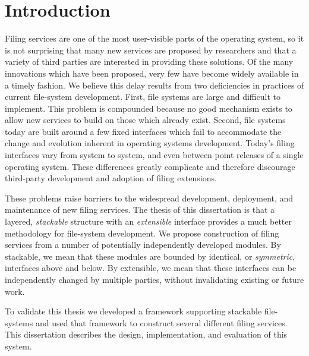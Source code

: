 
%
%

\chapter{Introduction}

Filing services are one of the most user-visible
  parts of the operating system,
  so it is not surprising that 
  many new services are proposed
  by researchers
  and that a variety of third parties are interested in providing
  these solutions.
Of the many innovations which have been proposed,
  very few have become widely available
  in a timely fashion.
We believe this delay results from two deficiencies
  in practices of current file-system development.
First,
  file systems are large and difficult to implement.
This problem is compounded because
  no good mechanism exists to allow
  new services to build on those which already exist.
Second,
  file systems today are built around a few fixed interfaces
  which fail to accommodate the change and evolution inherent in
  operating systems development.
Today's filing interfaces vary from
  system to system,
  and even between point releases of a 
  single operating system.
These differences greatly complicate and therefore discourage
  third-party development and adoption of filing extensions.

These problems raise barriers to the widespread
  development, deployment, and maintenance of new filing
  services.
The thesis of this dissertation is that
  a layered,
  \emph{stackable} structure
  with an \emph{extensible} interface
  provides a much better methodology
  for file-system development.
We propose construction of filing services from a number
  of potentially independently developed modules.
By stackable,
  we mean that these modules are bounded by
  identical, or \emph{symmetric}, interfaces above and below.
By extensible, we mean that these interfaces
  can be independently changed by multiple parties,
  without invalidating existing or future work.

To validate this thesis we developed a
  framework supporting stackable file-systems
  and used that framework to construct several
  different filing services.
This dissertation describes the design,
  implementation,
  and evaluation of this system. \cite{chari2020diverse}



